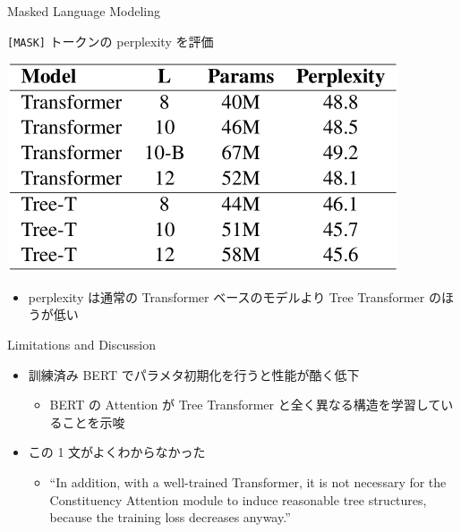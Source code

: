 \documentclass[unicode, 12pt, aspectratio=43]{beamer}
\begin{document}
\begin{frame}[label={sec:orgec2598a}]{Masked Language Modeling}
\begin{block}{\texttt{[MASK]} トークンの perplexity を評価}
\begin{center}
\includegraphics[width=0.5\linewidth]{./figure/Table4.pdf}
\end{center}
\begin{itemize}
\item perplexity は通常の Transformer ベースのモデルより Tree Transformer のほうが低い
\end{itemize}
\end{block}
\end{frame}

\begin{frame}[label={sec:org2b7f318}]{Limitations and Discussion}
\begin{itemize}
\item 訓練済み BERT でパラメタ初期化を行うと性能が酷く低下
\begin{itemize}
\item BERT の Attention が Tree Transformer と全く異なる構造を学習していることを示唆
\end{itemize}

\item この 1 文がよくわからなかった
\begin{itemize}
\item ``\textrm{In addition, with a well-trained Transformer, it is not necessary for the Constituency Attention module to induce reasonable tree structures, because the training loss decreases anyway.}''
\end{itemize}
\end{itemize}
\end{frame}
\end{document}
